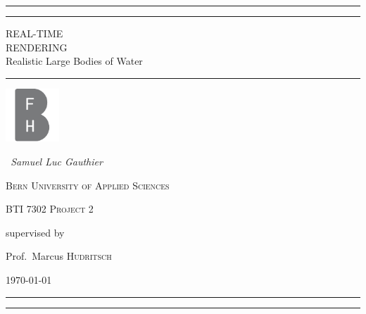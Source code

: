 \begin{titlepage}
	\centering

    \rule{0.9\textwidth}{1pt} 

	\vspace{2pt}\vspace{-\baselineskip}

	\rule{0.9\textwidth}{0.4pt}

	\vspace{0.1\textheight}

    \textcolor[rgb]{0.78,0,0}{
    {\Huge REAL-TIME}\\[0.5\baselineskip]
    {\Huge RENDERING}\\[1.7\baselineskip]
    {\Large Realistic Large Bodies of Water}\\
    }%

    \vspace{0.025\textheight}
    \rule{0.3\textwidth}{0.4pt}

    \vspace{2cm}
    \includegraphics[width=0.15\textwidth]{figures/BFH_Logo_BW.pdf}\par\vspace{1cm}
    \vspace{1cm}
    {\Large{\itshape~Samuel Luc Gauthier\/}\par}{}
    \vspace{0.5cm}
    {\scshape Bern University of Applied Sciences\par}
	{\scshape\Large BTI 7302 Project 2\par}

	\vspace{1cm}
	supervised by\par
	Prof.~Marcus \textsc{Hudritsch}
    \vspace{1cm}
	\vfill

    {\large \today\par}%
    \vfill

    \rule{0.9\textwidth}{0.4pt}

	\vspace{2pt}\vspace{-\baselineskip}

	\rule{0.9\textwidth}{1pt}

\end{titlepage}
\restoregeometry{}

